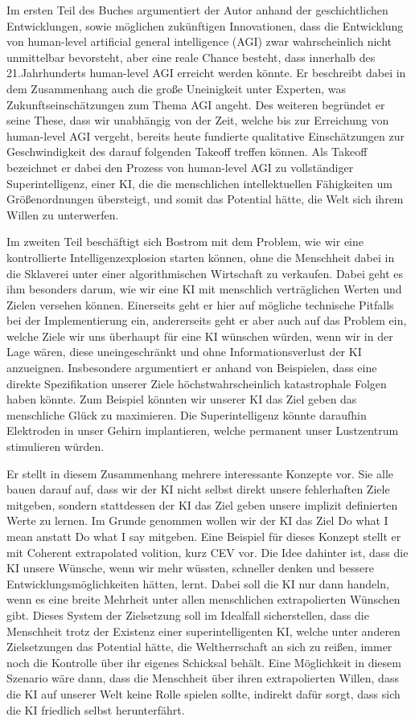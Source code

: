 \documentclass[twoside, a4paper, DIV=11, open=any, bibliography=totoc]{scrbook}
\newcommand{\Quote}[1]{\glqq #1\grqq{}}
\begin{document}
Im ersten Teil des Buches argumentiert der Autor anhand der geschichtlichen Entwicklungen,
sowie möglichen zukünftigen Innovationen, dass die Entwicklung von human-level artificial
general intelligence (AGI) zwar wahrscheinlich nicht unmittelbar bevorsteht, aber
eine reale Chance besteht, dass innerhalb des 21.Jahrhunderts human-level AGI
erreicht werden könnte. Er beschreibt dabei in dem Zusammenhang auch die große
Uneinigkeit unter Experten, was Zukunftseinschätzungen zum Thema AGI angeht.
Des weiteren begründet er seine These, dass wir unabhängig von der Zeit, welche
bis zur Erreichung von human-level AGI vergeht, bereits heute fundierte qualitative
Einschätzungen zur Geschwindigkeit des darauf folgenden \Quote{Takeoff} treffen können.
Als \Quote{Takeoff} bezeichnet er dabei den Prozess von human-level AGI zu
vollständiger Superintelligenz, einer KI, die die menschlichen intellektuellen Fähigkeiten
um Größenordnungen übersteigt, und somit das Potential hätte, die Welt sich ihrem
Willen zu unterwerfen.

Im zweiten Teil beschäftigt sich Bostrom mit dem Problem, wie wir eine kontrollierte
Intelligenzexplosion starten können, ohne die Menschheit dabei in die Sklaverei
unter einer algorithmischen Wirtschaft zu verkaufen. Dabei geht es ihm besonders
darum, wie wir eine KI mit menschlich verträglichen Werten und Zielen versehen können.
Einerseits geht er hier auf mögliche technische Pitfalls bei der Implementierung ein,
andererseits geht er aber auch auf das Problem ein, welche Ziele wir uns überhaupt
für eine KI wünschen würden, wenn wir in der Lage wären, diese uneingeschränkt und
ohne Informationsverlust der KI anzueignen.
Insbesondere argumentiert er anhand von Beispielen, dass eine direkte Spezifikation
unserer Ziele höchstwahrscheinlich katastrophale Folgen haben könnte.
Zum Beispiel könnten wir unserer KI das Ziel geben das menschliche Glück zu maximieren.
Die Superintelligenz könnte daraufhin Elektroden in unser Gehirn implantieren, welche
permanent unser Lustzentrum stimulieren würden.

Er stellt in diesem Zusammenhang mehrere interessante Konzepte vor.
Sie alle bauen darauf auf, dass wir der KI nicht selbst direkt unsere fehlerhaften
Ziele mitgeben, sondern stattdessen der KI das Ziel geben unsere implizit definierten
Werte zu lernen. Im Grunde genommen wollen wir der KI das Ziel \Quote{Do what I mean}
anstatt \Quote{Do what I say} mitgeben.
Eine Beispiel für dieses Konzept stellt er mit \Quote{Coherent extrapolated volition},
kurz CEV vor. Die Idee dahinter ist, dass die KI unsere Wünsche, wenn wir mehr wüssten,
schneller denken und bessere Entwicklungsmöglichkeiten hätten, lernt.
Dabei soll die KI nur dann handeln, wenn es eine breite Mehrheit unter allen
menschlichen extrapolierten Wünschen gibt.
Dieses System der Zielsetzung soll im Idealfall sicherstellen, dass die Menschheit
trotz der Existenz einer superintelligenten KI, welche unter anderen Zielsetzungen
das Potential hätte, die Weltherrschaft an sich zu reißen, immer noch die Kontrolle
über ihr eigenes Schicksal behält.
Eine Möglichkeit in diesem Szenario wäre dann, dass die Menschheit über ihren
extrapolierten Willen, dass die KI auf unserer Welt keine Rolle spielen sollte,
indirekt dafür sorgt, dass sich die KI friedlich selbst herunterfährt.
\end{document}
